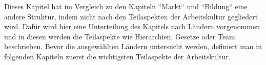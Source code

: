Dieses Kapitel hat im Vergleich zu den Kapiteln ``Markt`` und ``Bildung`` eine andere Struktur, indem nicht nach den Teilaspekten der Arbeitskultur gegliedert wird. Dafür wird hier eine Unterteilung des Kapitels nach Ländern vorgenommen und in diesen werden die Teilaspekte wie Hierarchien, Gesetze oder Team beschrieben.
Bevor die ausgewählten Ländern untersucht werden, definiert man in folgenden Kapiteln zuerst die wichtigsten Teilaspekte der Arbeitskultur.
